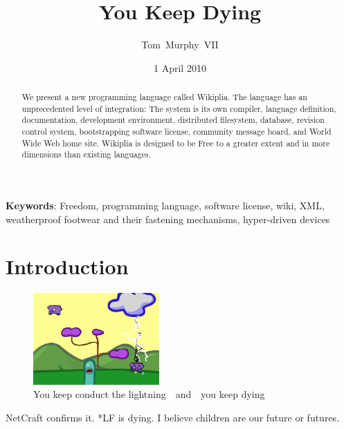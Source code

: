 \documentclass[twocolumn]{article}
\begin{document}
 

\title{ {\bf You Keep Dying } }
\author{Tom~Murphy~VII}
\date{1 April 2010}

\maketitle

\begin{abstract}
We present a new programming language called Wikiplia. The language
has an unprecedented level of integration: The system is its own
compiler, language definition, documentation, development environment,
distributed filesystem, database, revision control system,
bootstrapping software license, community message board, and World
Wide Web home site. Wikiplia is designed to be Free to a greater
extent and in more dimensions than existing languages.
\end{abstract}


\vspace{1em}
{\noindent \small {\bf Keywords}:
  Freedom, programming language, software license, wiki, XML, 
  weatherproof footwear and their fastening mechanisms,
  hyper-driven devices
}



\section{Introduction}


\begin{figure}[t]
\begin{center}
\includegraphics[width=0.43\textwidth]{lightning}
\end{center}
\caption{You keep conduct the lightning\ \ and\ \ you keep dying} \label{fig:lightning}
\end{figure}

NetCraft confirms it. *LF is dying.
I believe children are our future or futures.
\end{document}
